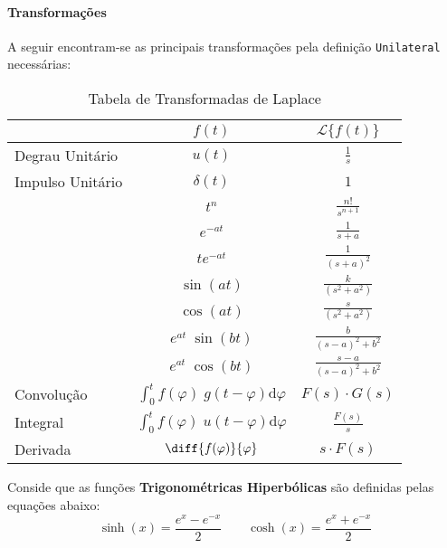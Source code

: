 \documentclass{article}
\begin{document}
            \paragraph{Transformações}A seguir encontram-se as principais transformações pela definição \texttt{Unilateral} necessárias:

                \begin{table}[H]
                    \centering
                    \begingroup
                    \renewcommand{\arraystretch}{1.25}
                    \begin{tabular}[]{lcc}
                                            & $f(t)$      & $\mathcal{L}\{ f(t) \}$\\\hline
                        Degrau Unitário  & $u(t)$      & $\frac{1}{s}$\\
                        Impulso Unitário & $\delta(t)$ & $1$\\
                                            & $t^{n}$     & $\frac{n!}{s^{n+1}}$\\
                                            & $e^{-at}$   & $\frac{1}{s+a}$\\
                                            & $te^{-at}$  & $\frac{1}{(s+a)^{2}}$\\
                                            & $\sin(at)$  & $\frac{k}{(s^2+a^2)}$\\
                                            & $\cos(at)$  & $\frac{s}{(s^2+a^2)}$\\
                                            & $e^{at}\;\sin(bt)$  & $\frac{b}{(s-a)^2+b^2}$\\
                                            & $e^{at}\;\cos(bt)$  & $\frac{s-a}{(s-a)^2+b^2}$\\
                        Convolução       & $\int_{0}^{t} f(\varphi)\;g(t - \varphi) \text{d}\varphi$ & $F(s)\cdot G(s)$\\
                        Integral         & $\int_{0}^{t} f(\varphi)\;u(t - \varphi) \text{d}\varphi$ & $\frac{F(s)}{s}$\\
                        Derivada         & $\diff{f(\varphi)}{\varphi} $ & $s\cdot F(s)$\\\hline
                    \end{tabular}
                    \endgroup
                    \caption{Tabela de Transformadas de Laplace}\label{table:Laplace}
                \end{table} \noindent
            Conside que as funções \textbf{Trigonométricas Hiperbólicas} são definidas pelas equações abaixo:
                \begin{equation}
                    \boxed{
                        \sinh(x) = \frac{e^{x} - e^{-x}}{2}
                    }
                    \qquad
                    \boxed{
                        \cosh(x) = \frac{e^{x} + e^{-x}}{2}
                    }
                \end{equation}
            \newpage
\end{document}
